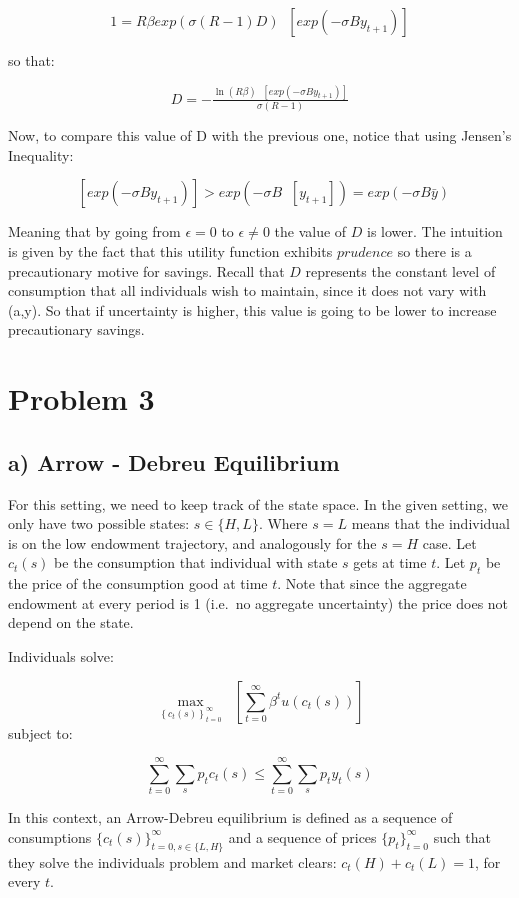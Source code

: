 \documentclass[11pt]{article}
\begin{document}
\[
1=R\beta exp(\sigma(R-1)D)\mathop{E_t}[exp(-\sigma By_{t+1})]
\]

so that:

\[
D=-\tfrac{\ln(R\beta)\mathop{E_t}[exp(-\sigma B y_{t+1})]}{\sigma (R-1)}
\]

Now, to compare this value of D with the previous one, notice that using
Jensen's Inequality:

\[
\mathop{E_t}[exp(-\sigma B y_{t+1})]>exp(-\sigma B \mathop{E_t}[y_{t+1}])=exp(-\sigma B \bar{y})
\]

Meaning that by going from \(\epsilon=0\) to \(\epsilon\neq0\) the value
of \(D\) is lower. The intuition is given by the fact that this utility
function exhibits \(\textit{prudence}\) so there is a precautionary
motive for savings. Recall that \(D\) represents the constant level of
consumption that all individuals wish to maintain, since it does not
vary with (a,y). So that if uncertainty is higher, this value is going
to be lower to increase precautionary savings.

    \hypertarget{problem-3}{%
\section{Problem 3}\label{problem-3}}

    \hypertarget{a-arrow---debreu-equilibrium}{%
\subsection{a) Arrow - Debreu
Equilibrium}\label{a-arrow---debreu-equilibrium}}

For this setting, we need to keep track of the state space. In the given
setting, we only have two possible states: \(s\in\{H,L\}\). Where
\(s=L\) means that the individual is on the low endowment trajectory,
and analogously for the \(s=H\) case. Let \(c_t(s)\) be the consumption
that individual with state \(s\) gets at time \(t\). Let \(p_t\) be the
price of the consumption good at time \(t\). Note that since the
aggregate endowment at every period is 1 (i.e.~no aggregate uncertainty)
the price does not depend on the state.

Individuals solve:

\[
\max_{\left\{c_t(s)\right\}_{t=0}^\infty} \mathop{E_{-1}}  \left[\sum_{t=0}^{\infty} \beta^t u(c_t(s))\right]
\] subject to:

\[\sum_{t=0}^{\infty} \sum_s p_t c_t(s)\leq \sum_{t=0}^{\infty} \sum_s p_t y_t(s)\]

In this context, an Arrow-Debreu equilibrium is defined as a sequence of
consumptions \(\{c_t(s)\}_{t=0, s\in\{L,H\}}^{\infty}\) and a sequence
of prices \(\{p_t\}_{t=0}^{\infty}\) such that they solve the
individuals problem and market clears: \(c_t(H)+c_t(L)=1\), for every
\(t\).
\end{document}
